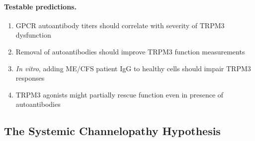\paragraph{Testable predictions.}
\begin{enumerate}
    \item GPCR autoantibody titers should correlate with severity of TRPM3 dysfunction
    \item Removal of autoantibodies should improve TRPM3 function measurements
    \item \textit{In vitro}, adding ME/CFS patient IgG to healthy cells should impair TRPM3 responses
    \item TRPM3 agonists might partially rescue function even in presence of autoantibodies
\end{enumerate}

\subsection{The Systemic Channelopathy Hypothesis}

